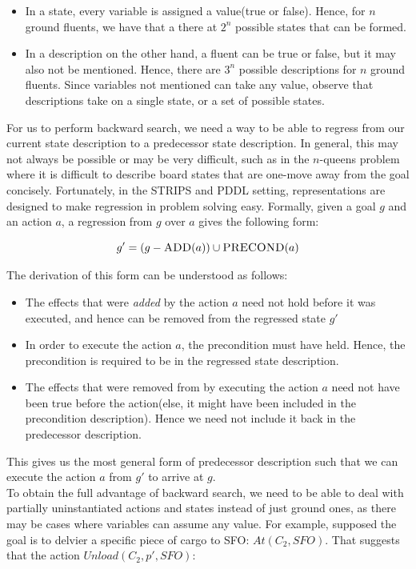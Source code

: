 \documentclass[11pt]{article}
\begin{document}
\begin{itemize}
    \item In a state, every variable is assigned a value(true or false). Hence, for $n$ ground fluents, we have that a there at $2^n$ possible states that can be formed.
    \item In a description on the other hand, a fluent can be true or false, but it may also not be mentioned. Hence, there are $3^n$ possible descriptions for $n$ ground fluents. Since variables not mentioned can take any value, observe that descriptions take on a single state, or a set of possible states.
\end{itemize}

For us to perform backward search, we need a way to be able to regress from our current state description to a predecessor state description. In general, this may not always be possible or may be very difficult, such as in the $n$-queens problem where it is difficult to describe board states that are one-move away from the goal concisely. Fortunately, in the \textsc{STRIPS} and \textsc{PDDL} setting, representations are designed to make regression in problem solving easy. Formally, given a goal $g$ and an action $a$, a regression from $g$ over $a$ gives the following form:

$$
g' = (g - \textsc{ADD}(a)) \cup \textsc{PRECOND}(a)
$$

The derivation of this form can be understood as follows:

\begin{itemize}
    \item The effects that were \textit{added} by the action $a$ need not hold before it was executed, and hence can be removed from the regressed state $g'$
    \item In order to execute the action $a$, the precondition must have held. Hence, the precondition is required to be in the regressed state description.
    \item The effects that were removed from by executing the action $a$ need not have been true before the action(else, it might have been included in the precondition description). Hence we need not include it back in the predecessor description.
\end{itemize}

This gives us the most general form of predecessor description such that we can execute the action $a$ from $g'$ to arrive at $g$.\\

To obtain the full advantage of backward search, we need to be able to deal with partially uninstantiated actions and states instead of just ground ones, as there may be cases where variables can assume any value. For example, supposed the goal is to delvier a specific piece of cargo to SFO: $At(C_2, SFO)$. That suggests that the action $Unload(C_2, p', SFO)$: 
\end{document}
